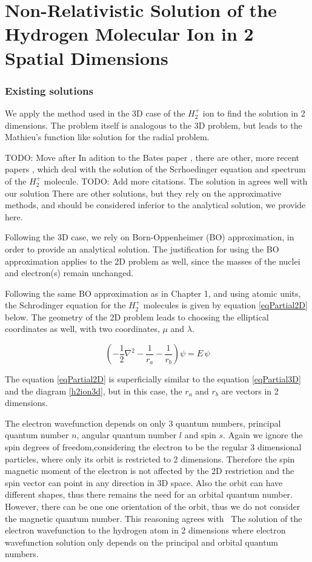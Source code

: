 \chapter{Non-Relativistic Solution of the Hydrogen Molecular Ion in 2 Spatial Dimensions}

\subsection{Existing solutions}

We apply the method used in the 3D case of the $ H_2^{+} $ ion to find the solution in 2 dimensions. The problem itself is analogous to the 3D problem, but leads to the Mathieu's function like solution for the radial problem.

TODO: Move after
In adition to the Bates paper \cite{Bates1}, there are other, more recent papers \cite{H2Plus2d1} \cite{TwoCentersParticle}, \cite{Kolos} which deal with the solution of the Scrhoedinger equation and spectrum of the $ H_2^{+} $ molecule. TODO: Add more citations.  The solution in \cite{H2Plus2d1} agrees well with our solution There are other solutions, but they rely on the approximative methods, and should be considered inferior to the analytical solution, we provide here. 

Following the 3D case, we rely on Born-Oppenheimer (BO) approximation, in order to provide an analytical solution. The justification for using the BO approximation applies to the 2D problem as well, since the masses of the nuclei and electron(s) remain unchanged.

Following the same BO approximation as in Chapter 1, and using atomic units, the Schrodinger equation for the $ H_2^{+} $ molecules is given by equation \eqref{eqPartial2D} below. The geometry of the 2D problem leads to choosing the elliptical coordinates as well, with two coordinates, $ \mu $ and $ \lambda $.

\begin{equation}\label{eqPartial2D}
\left(-\frac{1}{2}\nabla^2-\frac{1}{r_a}-\frac{1}{r_b}\right)\psi = E\,\psi
\end{equation}

The equation \eqref{eqPartial2D} is superficially similar to the equation \eqref{eqPartial3D} and the diagram \ref{h2ion3d}, but in this case, the $ r_a $ and $ r_b $ are vectors in 2 dimensions.

The electron wavefunction depends on only 3 quantum numbers, principal quantum number $ n $, angular quantum number $ l $ and spin $ s $. Again we ignore the spin degrees of freedom,considering the electron to be the regular 3 dimensional particles, where only its orbit is restricted to 2 dimensions.  Therefore the spin magnetic moment of the electron is not affected by the 2D restriction and the spin vector can point in any direction in 3D space. Also the orbit can have different shapes, thus there remains the need for an orbital quantum number. However, there can be one one orientation of the orbit, thus we do not consider the magnetic quantum number. This reasoning agrees with ~The solution of the electron wavefunction to the hydrogen atom in 2 dimensions \cite{H2atom} where electron wavefunction solution only depends on the principal and orbital quantum numbers.

